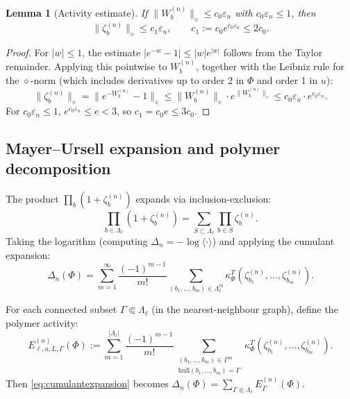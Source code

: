 \documentclass[12pt]{article}
\theoremstyle{plain}
\newtheorem{lemma}[theorem]{Lemma}
\theoremstyle{definition}
\numberwithin{equation}{section}
\begin{document}
\begin{lemma}[Activity estimate]\label{lem:activity}
If $\|W_b^{(n)}\|_\diamond\leq c_0\varepsilon_n$ with $c_0\varepsilon_n\leq 1$, then
\begin{equation}
\|\zeta_b^{(n)}\|_\diamond \leq c_1\varepsilon_n,\qquad c_1:=c_0 e^{c_0\varepsilon_n}\leq 2c_0.
\end{equation}
\end{lemma}

\begin{proof}
For $|w|\leq 1$, the estimate $|e^{-w}-1|\leq|w|e^{|w|}$ follows from the Taylor remainder.  Applying this pointwise to $W_b^{(n)}$, together with the Leibniz rule for the $\diamond$-norm (which includes derivatives up to order 2 in $\Phi$ and order 1 in $u$):
\begin{equation}
\|\zeta_b^{(n)}\|_\diamond = \|e^{-W_b^{(n)}}-1\|_\diamond \leq \|W_b^{(n)}\|_\diamond\cdot e^{\|W_b^{(n)}\|_\diamond} \leq c_0\varepsilon_n\cdot e^{c_0\varepsilon_n}.
\end{equation}
For $c_0\varepsilon_n\leq 1$, $e^{c_0\varepsilon_n}\leq e<3$, so $c_1=c_0 e\leq 3c_0$.
\end{proof}

\subsection{Mayer--Ursell expansion and polymer decomposition}

The product $\prod_b(1+\zeta_b^{(n)})$ expands via inclusion-exclusion:
\begin{equation}
\prod_{b\in\Lambda_\ell}(1+\zeta_b^{(n)}) = \sum_{S\subset\Lambda_\ell}\prod_{b\in S}\zeta_b^{(n)}.
\end{equation}
Taking the logarithm (computing $\Delta_n=-\log\langle\cdot\rangle$) and applying the cumulant expansion:
\begin{equation}\label{eq:cumulantexpansion}
\Delta_n(\Phi) = \sum_{m=1}^\infty\frac{(-1)^{m-1}}{m!}\sum_{(b_1,\ldots,b_m)\in\Lambda_\ell^m}\kappa_\Phi^T(\zeta_{b_1}^{(n)},\ldots,\zeta_{b_m}^{(n)}).
\end{equation}

For each connected subset $\Gamma\Subset\Lambda_\ell$ (in the nearest-neighbour graph), define the polymer activity:
\begin{equation}
E_{\ell,a,L,\Gamma}^{(n)}(\Phi) := \sum_{m=1}^{|\Lambda_\ell|}\frac{(-1)^{m-1}}{m!}\sum_{\substack{(b_1,\ldots,b_m)\in\Gamma^m\\\mathrm{hull}(b_1,\ldots,b_m)=\Gamma}}\kappa_\Phi^T(\zeta_{b_1}^{(n)},\ldots,\zeta_{b_m}^{(n)}).
\end{equation}
Then \eqref{eq:cumulantexpansion} becomes $\Delta_n(\Phi)=\sum_{\Gamma\Subset\Lambda_\ell}E_\Gamma^{(n)}(\Phi)$.
\end{document}
